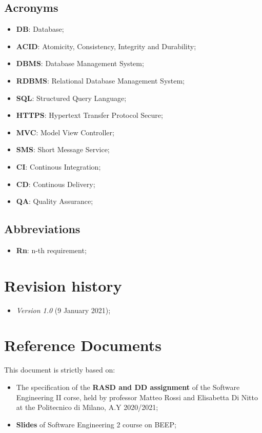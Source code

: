 \subsection{Acronyms}
\begin{itemize}
\item \textbf{DB}: Database;
\item \textbf{ACID}: Atomicity, Consistency, Integrity and Durability;
\item \textbf{DBMS}: Database Management System;
\item \textbf{RDBMS}: Relational Database Management System;
\item \textbf{SQL}: Structured Query Language;
\item \textbf{HTTPS}: Hypertext Transfer Protocol Secure;
\item \textbf{MVC}: Model View Controller;
\item \textbf{SMS}: Short Message Service;
\item \textbf{CI}: Continous Integration;
\item \textbf{CD}: Continous Delivery;
\item \textbf{QA}: Quality Assurance;
\end{itemize}


\subsection{Abbreviations}
\begin{itemize}
\item \textbf{Rn}: n-th requirement;
\end{itemize}


\section{Revision history}
\begin{itemize}
\item \textit{Version 1.0} (9 January 2021);
\end{itemize}
\section{Reference Documents}
This document is strictly based on:
\begin{itemize}
\item The specification of the \textbf{RASD and DD assignment} of the Software Engineering II corse, held by professor Matteo Rossi and Elisabetta Di Nitto at the Politecnico di Milano, A.Y 2020/2021;
\item \textbf{Slides} of Software Engineering 2 course on BEEP;
\end{itemize}
